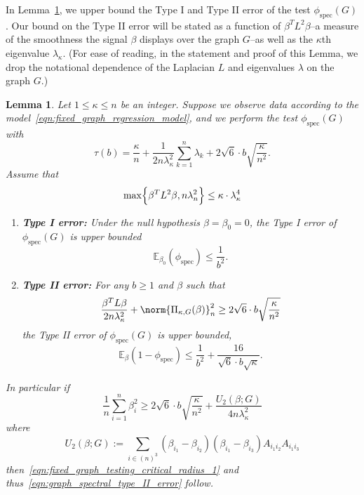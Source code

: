 \documentclass{article}
\newcommand{\1}{\mathbf{1}}
\newcommand{\spec}{\mathrm{spec}}
\theoremstyle{alden}
\theoremstyle{aldenthm}
\newtheorem{lemma}{Lemma}
\theoremstyle{definition}
\theoremstyle{remark}
\begin{document}
In Lemma~\ref{lem:fixed_graph_testing}, we upper bound the Type I and Type II error of the test $\phi_{\spec}(G)$. Our bound on the Type II error will be stated as a function of $\beta^T L^2 \beta$--a measure of the smoothness the signal $\beta$ displays over the graph $G$--as well as the $\kappa$th eigenvalue $\lambda_{\kappa}$. (For ease of reading, in the statement and proof of this Lemma, we drop the notational dependence of the Laplacian $L$ and eigenvalues $\lambda$ on the graph $G$.) 

\begin{lemma}
	\label{lem:fixed_graph_testing}
	Let $1 \leq \kappa \leq n$ be an integer. Suppose we observe data according to the model~\eqref{eqn:fixed_graph_regression_model}, and we perform the test $\phi_{\spec}(G)$ with
	\begin{equation*}
	\tau(b) = \frac{\kappa}{n} + \frac{1}{2n\lambda_{\kappa}^2}\sum_{k = 1}^{n}\lambda_k + 2\sqrt{6}\cdot b\sqrt{\frac{\kappa}{n^2}}.
	\end{equation*} 
	Assume that
	\begin{equation}
	\label{eqn:graph_spectral_1}
	\max\Bigl\{\beta^T L^2 \beta, n \lambda_n^2\Bigr\} \leq \kappa \cdot \lambda_{\kappa}^4
	\end{equation}
	\begin{enumerate}
		\item \textbf{Type I error:} Under the null hypothesis $\beta = \beta_0 = 0$, the Type I error of $\phi_{\spec}(G)$ is upper bounded
		\begin{equation}
		\label{eqn:graph_spectral_type_I_error}
		\mathbb{E}_{\beta_0}(\phi_{\spec}) \leq \frac{1}{b^2}.
		\end{equation}
		\item \textbf{Type II error:} For any $b \geq 1$ and $\beta$ such that
		\begin{equation}
		\label{eqn:fixed_graph_testing_critical_radius_1}
		\frac{\beta^T L \beta}{2 n \lambda_{\kappa}^2} + \norm{\Pi_{\kappa,G}(\beta)}_n^2 \geq 2 \sqrt{6} \cdot b\sqrt{\frac{\kappa}{n^2}}
		\end{equation}
		the Type II error of $\phi_{\spec}(G)$ is upper bounded,
		\begin{equation}
		\label{eqn:graph_spectral_type_II_error}
		\mathbb{E}_{\beta}(1 - \phi_{\spec}) \leq \frac{1}{b^2} + \frac{16}{\sqrt{6} \cdot b\sqrt{\kappa}}.
		\end{equation}
	\end{enumerate}
    In particular if
    \begin{equation}
    \label{eqn:fixed_graph_testing_critical_radius}
    \frac{1}{n} \sum_{i = 1}^{n} \beta_i^2 \geq 2\sqrt{6} \cdot b\sqrt{\frac{\kappa}{n^2}} + \frac{U_2(\beta;G)}{4 n\lambda_{\kappa}^2}
    \end{equation}
    where
    \begin{equation*}
    U_2(\beta;G) := \sum_{i \in (n)^3} (\beta_{i_1} - \beta_{i_2}) (\beta_{i_1} - \beta_{i_3}) A_{i_1i_2} A_{i_1i_3}
    \end{equation*}
    then~\eqref{eqn:fixed_graph_testing_critical_radius_1} and thus~\eqref{eqn:graph_spectral_type_II_error} follow.
\end{lemma}
\end{document}
